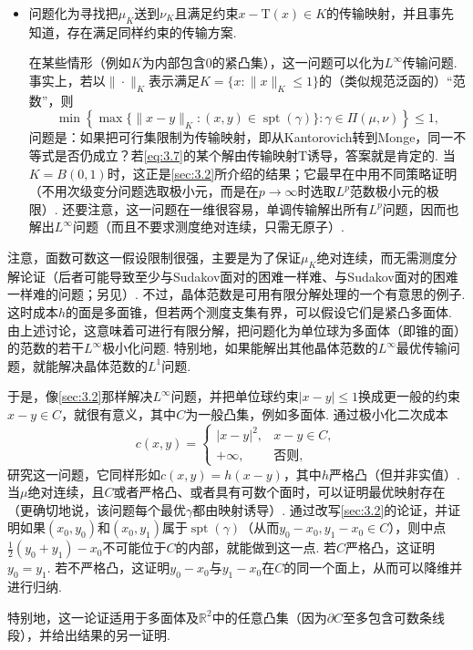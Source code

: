 \begin{itemize}
\item 问题化为寻找把$\mu_K$送到$\nu_K$且满足约束$x-\mathrm T(x)\in K$的传输映射，并且事先知道，存在满足同样约束的传输方案.

在某些情形（例如$K$为内部包含$0$的紧凸集），这一问题可以化为$L^\infty$传输问题. 事实上，若以$\|\cdot\|_K$表示满足$K=\{x:\|x\|_K\le1\}$的（类似规范泛函的）“范数”，则
\begin{equation}\label{eq:3.7}
\min\left\{\max\{\|x-y\|_K:(x,y)\in\operatorname{spt}(\gamma)\}:\gamma\in\Pi(\mu,\nu)\right\}\le1,
\end{equation}
问题是：如果把可行集限制为传输映射，即从Kantorovich转到Monge，同一不等式是否仍成立？若\eqref{eq:3.7}的某个解由传输映射$\mathrm T$诱导，答案就是肯定的. 当$K=B(0,1)$时，这正是\autoref{sec:3.2}所介绍的结果；它最早在\cite{b122}中用不同策略证明（不用次级变分问题选取极小元，而是在$p\to\infty$时选取$L^p$范数极小元的极限）. 还要注意，这一问题在一维很容易，单调传输解出所有$L^p$问题，因而也解出$L^\infty$问题（而且不要求测度绝对连续，只需无原子）.
\end{itemize}

注意，面数可数这一假设限制很强，主要是为了保证$\mu_K$绝对连续，而无需测度分解论证（后者可能导致至少与Sudakov面对的困难一样难、与Sudakov面对的困难一样难的问题；另见\cite{b104}）. 不过，晶体范数是可用有限分解处理的一个有意思的例子. 这时成本$h$的面是多面锥，但若两个测度支集有界，可以假设它们是紧凸多面体. 由上述讨论，这意味着可进行有限分解，把问题化为单位球为多面体（即锥的面）的范数的若干$L^\infty$极小化问题. 特别地，如果能解出其他晶体范数的$L^\infty$最优传输问题，就能解决晶体范数的$L^1$问题.

于是，像\autoref{sec:3.2}那样解决$L^\infty$问题，并把单位球约束$|x-y|\le1$换成更一般的约束$x-y\in C$，就很有意义，其中$C$为一般凸集，例如多面体. \cite{b197}通过极小化二次成本
\[
c(x,y)=\begin{cases}|x-y|^2,&x-y\in C,\\+\infty,&\text{否则},\end{cases}
\]
研究这一问题，它同样形如$c(x,y)=h(x-y)$，其中$h$严格凸（但并非实值）. 当$\mu$绝对连续，且$C$或者严格凸、或者具有可数个面时，可以证明最优映射存在（更确切地说，该问题每个最优$\gamma$都由映射诱导）. 通过改写\autoref{sec:3.2}的论证，并证明如果$(x_0,y_0)$和$(x_0,y_1)$属于$\operatorname{spt}(\gamma)$（从而$y_0-x_0,y_1-x_0\in C$），则中点$\frac12(y_0+y_1)-x_0$不可能位于$C$的内部，就能做到这一点. 若$C$严格凸，这证明$y_0=y_1$. 若不严格凸，这证明$y_0-x_0$与$y_1-x_0$在$C$的同一个面上，从而可以降维并进行归纳.

特别地，这一论证适用于多面体及$\mathbb R^2$中的任意凸集（因为$\partial C$至多包含可数条线段），并给出\cite{b14}结果的另一证明.

